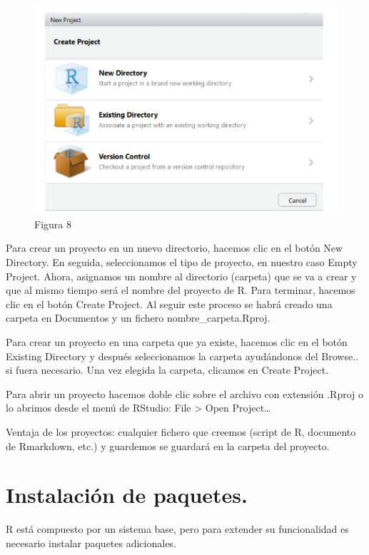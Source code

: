 \documentclass[
]{book}
\begin{document}
\begin{figure}
\centering
\includegraphics{imagenes/09.png}
\caption{Figura 8}
\end{figure}

Para crear un proyecto en un nuevo directorio, hacemos clic en el botón New Directory. En seguida, seleccionamos el tipo de proyecto, en nuestro caso Empty Project. Ahora, asignamos un nombre al directorio (carpeta) que se va a crear y que al mismo tiempo será el nombre del proyecto de R. Para terminar, hacemos clic en el botón Create Project. Al seguir este proceso se habrá creado una carpeta en Documentos y un fichero nombre\_carpeta.Rproj.

Para crear un proyecto en una carpeta que ya existe, hacemos clic en el botón Existing Directory y después seleccionamos la carpeta ayudándonos del Browse.. si fuera necesario. Una vez elegida la carpeta, clicamos en Create Project.

Para abrir un proyecto hacemos doble clic sobre el archivo con extensión .Rproj o lo abrimos desde el menú de RStudio: File \textgreater{} Open Project\ldots{}

Ventaja de los proyectos: cualquier fichero que creemos (script de R, documento de Rmarkdown, etc.) y guardemos se guardará en la carpeta del proyecto.

\hypertarget{instalaciuxf3n-de-paquetes.}{%
\section{Instalación de paquetes.}\label{instalaciuxf3n-de-paquetes.}}

R está compuesto por un sistema base, pero para extender su funcionalidad es necesario instalar paquetes adicionales.
\end{document}

